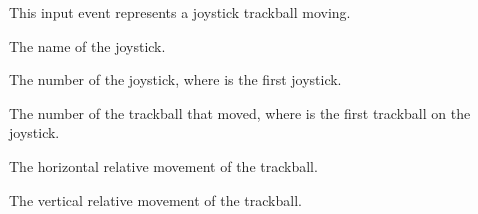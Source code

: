 \documentclass[letterpaper,10pt,english]{sphinxmanual}
\begin{document}

\begin{fulllineitems}
\label{input:sge.input.JoystickTrackballMove}
This input event represents a joystick trackball moving.

\begin{fulllineitems}
\label{input:sge.input.JoystickTrackballMove.js_name}
The name of the joystick.

\end{fulllineitems}


\begin{fulllineitems}
\label{input:sge.input.JoystickTrackballMove.js_id}
The number of the joystick, where  is the first joystick.

\end{fulllineitems}


\begin{fulllineitems}
\label{input:sge.input.JoystickTrackballMove.ball}
The number of the trackball that moved, where  is the first
trackball on the joystick.

\end{fulllineitems}


\begin{fulllineitems}
\label{input:sge.input.JoystickTrackballMove.x}
The horizontal relative movement of the trackball.

\end{fulllineitems}


\begin{fulllineitems}
\label{input:sge.input.JoystickTrackballMove.y}
The vertical relative movement of the trackball.

\end{fulllineitems}


\end{fulllineitems}
\end{document}
